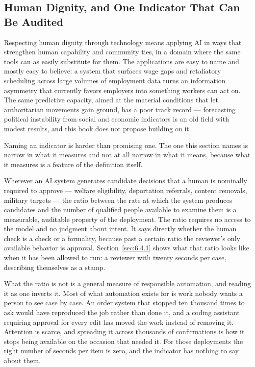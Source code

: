 \subsection{Human Dignity, and One Indicator That Can Be Audited}
\label{sec:5.1.3}
Respecting human dignity through technology means applying AI in ways that strengthen human capability and community ties, in a domain where the same tools can as easily substitute for them. The applications are easy to name and mostly easy to believe: a system that surfaces wage gaps and retaliatory scheduling across large volumes of employment data turns an information asymmetry that currently favors employers into something workers can act on. The same predictive capacity, aimed at the material conditions that let authoritarian movements gain ground, has a poor track record — forecasting political instability from social and economic indicators is an old field with modest results, and this book does not propose building on it.

Naming an indicator is harder than promising one. The one this section names is narrow in what it measures and not at all narrow in what it means, because what it measures is a feature of the definition itself.

Wherever an AI system generates candidate decisions that a human is nominally required to approve — welfare eligibility, deportation referrals, content removals, military targets — the ratio between the rate at which the system produces candidates and the number of qualified people available to examine them is a measurable, auditable property of the deployment. The ratio requires no access to the model and no judgment about intent. It says directly whether the human check is a check or a formality, because past a certain ratio the reviewer's only available behavior is approval. Section~\ref{sec:6.4.1} shows what that ratio looks like when it has been allowed to run: a reviewer with twenty seconds per case, describing themselves as a stamp.

What the ratio is not is a general measure of responsible automation, and reading it as one inverts it. Most of what automation exists for is work nobody wants a person to see case by case. An order system that stopped ten thousand times to ask would have reproduced the job rather than done it, and a coding assistant requiring approval for every edit has moved the work instead of removing it. Attention is scarce, and spreading it across thousands of confirmations is how it stops being available on the occasion that needed it. For those deployments the right number of seconds per item is zero, and the indicator has nothing to say about them.


